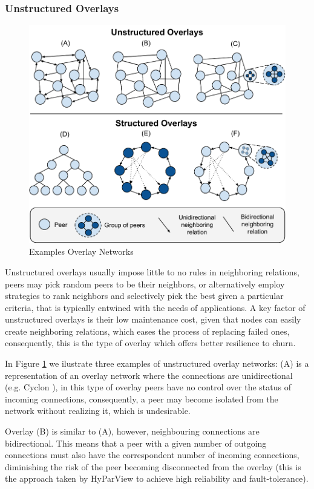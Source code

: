 \subsubsection*{Unstructured Overlays}

\begin{figure}
    \centering
    \includegraphics[width=0.60\linewidth]{Figures/overlay_networks.pdf}
    \caption{Examples Overlay Networks}
    \label{fig:overlay_networks}
\end{figure}

Unstructured overlays usually impose little to no rules in neighboring relations, peers may pick random peers to be their neighbors, or alternatively employ strategies to rank neighbors and selectively pick the best given a particular criteria, that is typically entwined with the needs of applications. A key factor of unstructured overlays is their low maintenance cost, given that nodes can easily create neighboring relations, which eases the process of replacing failed ones, consequently, this is the type of overlay which offers better resilience to churn.

In Figure \ref{fig:overlay_networks} we ilustrate three examples of unstructured overlay networks: (A) is a representation of an overlay network where the connections are unidirectional (e.g. Cyclon \cite{jelasity2007gossip}), in this type of overlay peers have no control over the status of incoming connections, consequently, a peer may become isolated from the network without realizing it, which is undesirable. 

Overlay (B) is similar to (A), however, neighbouring connections are bidirectional. This means that a peer with a given number of outgoing connections must also have the correspondent number of incoming connections, diminishing the risk of the peer becoming disconnected from the overlay (this is the approach taken by HyParView \cite{Hyparview} to achieve high reliability and fault-tolerance).

